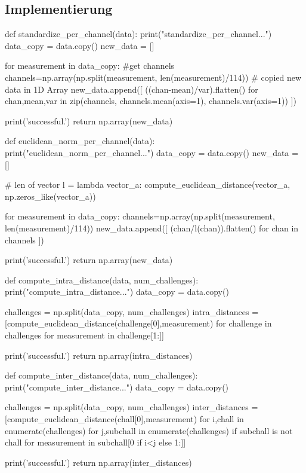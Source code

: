 \subsection{Implementierung}

\begin{python}
def standardize_per_channel(data):
	print("standardize_per_channel...")
	data_copy = data.copy()
	new_data = []
	
	for measurement in data_copy: 
		#get channels
		channels=np.array(np.split(measurement, len(measurement)/114)) 
		# copied new data in 1D Array
		new_data.append([ ((chan-mean)/var).flatten() for chan,mean,var in zip(channels, channels.mean(axis=1), channels.var(axis=1)) ])
    
	print('successful.')
	return np.array(new_data)
\end{python}

\hfill \break
\hfill \break

\begin{python}

def euclidean_norm_per_channel(data):
	print("euclidean_norm_per_channel...")
	data_copy = data.copy()
	new_data = []
	
	# len of vector
	l = lambda vector_a: compute_euclidean_distance(vector_a, np.zeros_like(vector_a))
	
	for measurement in data_copy: 
		channels=np.array(np.split(measurement, len(measurement)/114))
		new_data.append([ (chan/l(chan)).flatten() for chan in channels ])


	print('successful.')
	return np.array(new_data)
\end{python}

\newpage

\begin{python}    
def compute_intra_distance(data, num_challenges):
	print("compute_intra_distance...")
	data_copy = data.copy()

	challenges = np.split(data_copy, num_challenges)
	intra_distances = [compute_euclidean_distance(challenge[0],measurement) 
                       for challenge in challenges
                       for measurement in challenge[1:]]
    
	print('successful.')
	return np.array(intra_distances)
\end{python}

\hfill \break
\hfill \break

\begin{python}
def compute_inter_distance(data, num_challenges):
	print("compute_inter_distance...")
	data_copy = data.copy()

	challenges = np.split(data_copy, num_challenges)
	inter_distances = [compute_euclidean_distance(chall[0],measurement)
                       for i,chall in enumerate(challenges)
                       for j,subchall in enumerate(challenges)
                       if subchall is not chall
                       for measurement in subchall[0 if i<j else 1:]]

	print('successful.')
	return np.array(inter_distances)
\end{python}